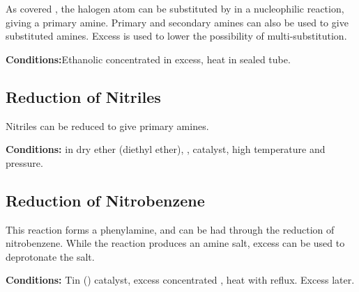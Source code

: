 			As covered \hyperlink{NucleophilicSubstitutionFormingAmines}{}, the halogen atom can be substituted by 
			in a nucleophilic reaction, giving a primary amine. Primary and secondary amines can also be used to give substituted amines.
			Excess  is used to lower the possibility of multi-substitution.

			\vspace{1.5em}
			\vbox{\textbf{Conditions:}\tabto{35mm}Ethanolic concentrated  in excess, heat in sealed tube.}




		\subsection{Reduction of Nitriles}

			Nitriles can be reduced to give primary amines.

			\vspace{1.5em}
			\vbox{\textbf{Conditions:}	\tabto{35mm} in dry ether (diethyl ether), 
										\tabto{35mm},  catalyst, high temperature and pressure.}




		\subsection{Reduction of Nitrobenzene}

			This reaction forms a phenylamine, and can be had through the reduction of nitrobenzene. While the reaction produces an amine
			salt, excess  can be used to deprotonate the salt.

			\vspace{1.5em}
			\vbox{\textbf{Conditions:}	\tabto{35mm}Tin () catalyst, excess concentrated ,
										\tabto{35mm}heat with reflux. Excess  later.}

